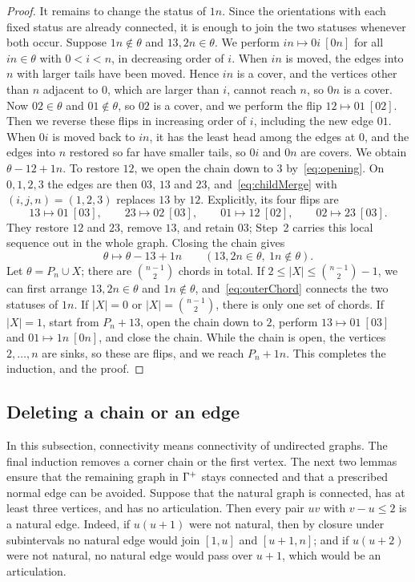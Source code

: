 \begin{proof}
It remains to change the status of $1n$.
Since the orientations with each fixed status are already connected, it is
enough to join the two statuses whenever both occur.
Suppose $1n\notin\theta$ and $13,2n\in\theta$.
We perform $in\mapsto 0i\ [0n]$ for all $in\in\theta$ with $0<i<n$, in decreasing
order of $i$.
When $in$ is moved, the edges into $n$ with larger tails have been moved.
Hence $in$ is a cover, and the vertices other than $n$ adjacent to $0$, which are
larger than $i$, cannot reach $n$, so $0n$ is a cover.
Now $02\in\theta$ and $01\notin\theta$, so $02$ is a cover, and we perform the
flip $12\mapsto 01\ [02]$.
Then we reverse these flips in increasing order of $i$, including the new edge
$01$.
When $0i$ is moved back to $in$, it has the least head among the edges at $0$,
and the edges into $n$ restored so far have smaller tails, so $0i$ and $0n$ are
covers.
We obtain $\theta-12+1n$.
To restore $12$, we open the chain down to $3$ by~\eqref{eq:opening}.
On $0,1,2,3$ the edges are then $03$, $13$ and $23$, and~\eqref{eq:childMerge}
with $(i,j,n)=(1,2,3)$ replaces $13$ by $12$.
Explicitly, its four flips are
\[
 13\mapsto01\ [03],\qquad 23\mapsto02\ [03],\qquad
 01\mapsto12\ [02],\qquad 02\mapsto23\ [03].
\]
They restore $12$ and $23$, remove $13$, and retain $03$; Step~2 carries this
local sequence out in the whole graph.
Closing the chain gives
\begin{equation}\label{eq:outerChord}
 \theta\longmapsto\theta-13+1n\qquad(13,2n\in\theta,\ 1n\notin\theta).
\end{equation}
Let $\theta=P_n\cup X$; there are $\binom{n-1}{2}$ chords in total.
If $2\leq|X|\leq\binom{n-1}{2}-1$, we can first arrange $13,2n\in\theta$ and
$1n\notin\theta$, and~\eqref{eq:outerChord} connects the two statuses of $1n$.
If $|X|=0$ or $|X|=\binom{n-1}{2}$, there is only one set of chords.
If $|X|=1$, start from $P_n+13$, open the chain down to $2$, perform
$13\mapsto01\ [03]$ and $01\mapsto 1n\ [0n]$, and close the chain.
While the chain is open, the vertices $2,\dotsc,n$ are sinks, so these are flips,
and we reach $P_n+1n$.
This completes the induction, and the proof.
\end{proof}

\subsection{Deleting a chain or an edge}

In this subsection, connectivity means connectivity of undirected graphs.
The final induction removes a corner chain or the first vertex.
The next two lemmas ensure that the remaining graph in $\Gamma^{+}$ stays connected
and that a prescribed normal edge can be avoided.
Suppose that the natural graph is connected, has at least three vertices, and
has no articulation.
Then every pair $uv$ with $v-u\leq2$ is a natural edge.
Indeed, if $u(u+1)$ were not natural, then by closure under subintervals no
natural edge would join $[1,u]$ and $[u+1,n]$; and if $u(u+2)$ were not natural,
no natural edge would pass over $u+1$, which would be an articulation.

